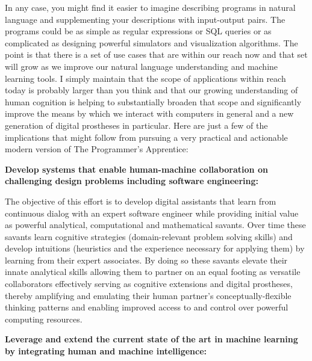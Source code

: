 In any case, you might find it easier to imagine describing programs in natural language and supplementing your descriptions with input-output pairs. The programs could be as simple as regular expressions or SQL queries or as complicated as designing powerful simulators and visualization algorithms. The point is that there is a set of use cases that are within our reach now and that set will grow as we improve our natural language understanding and machine learning tools. I simply maintain that the scope of applications within reach today is probably larger than you think and that our growing understanding of human cognition is helping to substantially broaden that scope and significantly improve the means by which we interact with computers in general and a new generation of digital prostheses in particular. Here are just a few of the implications that might follow from pursuing a very practical and actionable modern version of The Programmer's Apprentice:


{\bf{Develop systems that enable human-machine collaboration on challenging design problems including software engineering:}}

The objective of this effort is to develop digital assistants that learn from continuous dialog with an expert software engineer while providing initial value as powerful analytical, computational and mathematical savants. Over time these savants learn cognitive strategies (domain-relevant problem solving skills) and develop intuitions (heuristics and the experience necessary for applying them) by learning from their expert associates. By doing so these savants elevate their innate analytical skills allowing them to partner on an equal footing as versatile collaborators \emdash{} effectively serving as cognitive extensions and digital prostheses, thereby amplifying and emulating their human partner's conceptually-flexible thinking patterns and enabling improved access to and control over powerful computing resources. 


{\bf{Leverage and extend the current state of the art in machine learning by integrating human and machine intelligence:}}

